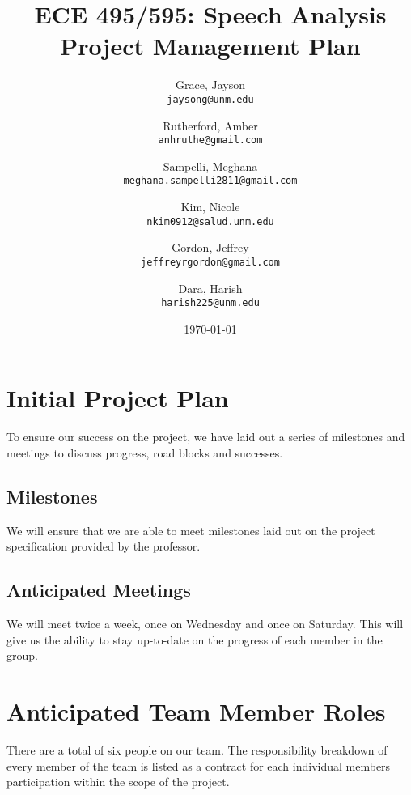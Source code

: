 \documentclass[12pt, a4paper, oneside]{article}
\begin{document}
\title{ECE 495/595: Speech Analysis Project Management Plan}
\author{
  Grace, Jayson \\
  \texttt{jaysong@unm.edu}
  \and
  Rutherford, Amber \\
  \texttt{anhruthe@gmail.com}  
  \and
  Sampelli, Meghana \\
  \texttt{meghana.sampelli2811@gmail.com}
  \and
  Kim, Nicole \\
  \texttt{nkim0912@salud.unm.edu}
  \and
  Gordon, Jeffrey \\
  \texttt{jeffreyrgordon@gmail.com}
  \and
  Dara, Harish \\
  \texttt{harish225@unm.edu} 
}
\date{\today}%
\maketitle

\pagebreak
{}

\section*{Initial Project Plan}
To ensure our success on the project, we have laid out a series of milestones and meetings to discuss progress, road blocks and successes.

\subsection*{Milestones}

We will ensure that we are able to meet milestones laid out on the project specification provided by the professor.

\subsection*{Anticipated Meetings}

We will meet twice a week, once on Wednesday and once on Saturday. This will give us the ability to stay up-to-date on the progress of each member in the group.

\section*{Anticipated Team Member Roles}
There are a total of six people on our team. The responsibility breakdown of every member of the team is listed as a contract for each individual members participation within the scope of the project.
\end{document}
